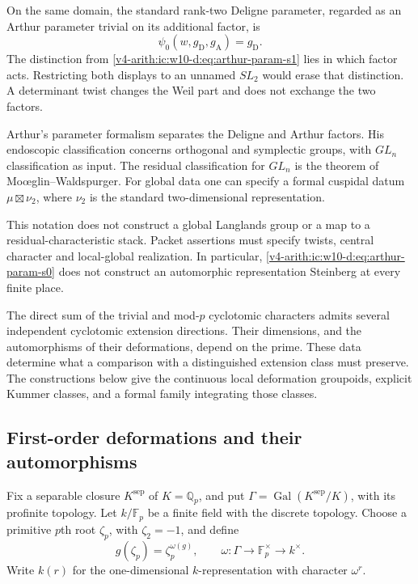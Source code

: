 \begin{definition}
\label{v4-arith:ic:w10-d:def:arthur-param-s0}
On the same domain, the standard rank-two Deligne parameter, regarded
as an Arthur parameter trivial on its additional factor, is
\begin{equation}\label{v4-arith:ic:w10-d:eq:arthur-param-s0}
 \psi_0(w,g_{\mathrm D},g_{\mathrm A})=g_{\mathrm D}.
\end{equation}
The distinction from \eqref{v4-arith:ic:w10-d:eq:arthur-param-s1} lies in
which factor acts. Restricting both displays to an unnamed $SL_2$
would erase that distinction. A determinant twist changes the Weil
part and does not exchange the two factors.
\end{definition}

\begin{remark}
\label{v4-arith:ic:w10-d:rem:arthur-gln}
Arthur's parameter formalism separates the Deligne and Arthur factors.
His endoscopic classification concerns orthogonal and symplectic groups,
with $GL_n$ classification as input. The residual classification for
$GL_n$ is the theorem of Mo{\oe}glin--Waldspurger.
For global data one can specify a formal cuspidal datum
$\mu\boxtimes\nu_2$, where $\nu_2$ is the standard two-dimensional
representation.

This notation does not construct a global Langlands
group or a map to a residual-characteristic stack. Packet assertions
must specify twists, central character and local-global realization.
In particular, \eqref{v4-arith:ic:w10-d:eq:arthur-param-s0} does not
construct an automorphic representation Steinberg at every finite place.
\end{remark}

The direct sum of the trivial and mod-\(p\) cyclotomic characters
admits several independent cyclotomic extension directions. Their dimensions, and the automorphisms
of their deformations, depend on the prime. These data determine what a
comparison with a distinguished extension class must preserve.
The constructions below give the continuous local deformation groupoids,
explicit Kummer classes, and a formal family integrating those classes.

\subsection{First-order deformations and their automorphisms}

Fix a separable closure \(K^{\mathrm{sep}}\) of \(K=\mathbb Q_p\), and
put \(\Gamma=\operatorname{Gal}(K^{\mathrm{sep}}/K)\), with its profinite topology.
Let \(k/\mathbb F_p\) be a finite field with the discrete topology.
Choose a primitive \(p\)th root \(\zeta_p\), with \(\zeta_2=-1\), and define
\[
 g(\zeta_p)=\zeta_p^{\omega(g)},\qquad
 \omega:\Gamma\longrightarrow\mathbb F_p^\times\longrightarrow k^\times.
\]
Write \(k(r)\) for the one-dimensional \(k\)-representation with character
\(\omega^r\).

